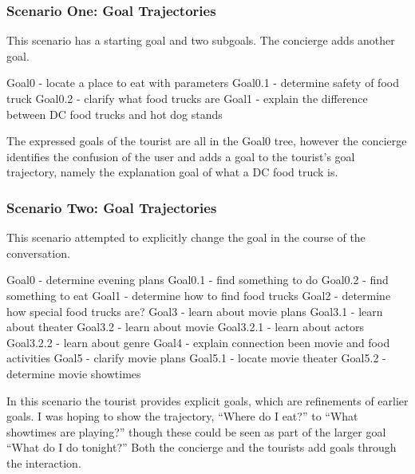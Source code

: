 \subsubsection{Scenario One: Goal Trajectories}

This scenario has a starting goal and two subgoals. The concierge adds another goal.

Goal0  - locate a place to eat with parameters
Goal0.1 - determine safety of food truck
Goal0.2 - clarify what food trucks are
Goal1 - explain the difference between DC food trucks and hot dog stands

The expressed goals of the tourist are all in the Goal0 tree, however the concierge identifies the confusion of the user and adds a goal to the tourist’s goal trajectory, namely the explanation goal of what a DC food truck is.

\subsubsection{Scenario Two: Goal Trajectories}

This scenario attempted to explicitly change the goal in the course of the conversation.

Goal0 - determine evening plans
Goal0.1 - find something to do
Goal0.2 - find something to eat
Goal1 - determine how to find food trucks
Goal2 - determine how special food trucks are?
Goal3 - learn about movie plans
Goal3.1 - learn about theater
Goal3.2 - learn about movie
Goal3.2.1 - learn about actors
Goal3.2.2 - learn about genre
Goal4 - explain connection been movie and food activities
Goal5 - clarify movie plans
Goal5.1 - locate movie theater
Goal5.2 - determine movie showtimes

In this scenario the tourist provides explicit goals, which are refinements of earlier goals. I was hoping to show the trajectory, “Where do I eat?” to “What showtimes are playing?” though these could be seen as part of the larger goal “What do I do tonight?” Both the concierge and the tourists add goals through the interaction.
